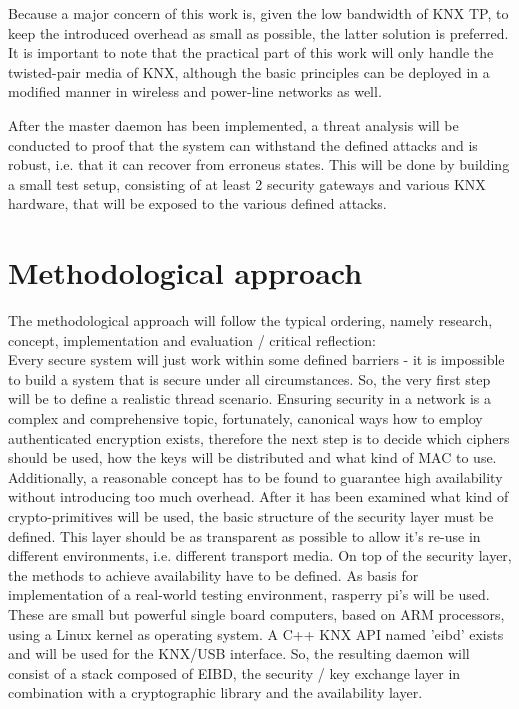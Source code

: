 \documentclass[a4paper,12pt,twoside]{memoir}
\begin{document}
Because a  major concern of this work is, given the low
bandwidth of KNX TP, to keep the introduced overhead as small as possible, the latter solution is preferred. It is important to note that the practical part of this work will only
handle the twisted-pair media of KNX, although the basic principles can be deployed in a modified manner in
wireless and power-line networks as well. 

After the master daemon has been implemented, a threat analysis will be conducted to proof that the system can withstand the defined attacks and is robust,
i.e. that it can recover from erroneus states. This will be done by building a small test setup, consisting of at least 2 security gateways and various
KNX hardware, that will be exposed to the various defined attacks.

\section{Methodological approach}

The methodological approach will follow the typical ordering, namely research, concept, implementation and 
evaluation / critical reflection:
\\

Every secure system will just work within some defined barriers - it is impossible to build a system that
is secure under all circumstances. So, the very first step will be to define a realistic
thread scenario. 
Ensuring security in a network is a complex and comprehensive topic, fortunately, canonical ways how to employ authenticated
encryption exists, therefore the next step is to decide which ciphers should be used, how the keys will
be  distributed and what kind of MAC to use. Additionally, a reasonable concept has to be found
to guarantee high availability without introducing too much overhead.
After it has been examined what kind of crypto-primitives will be used, the basic structure 
of the security layer must be defined. This layer should be as transparent as possible to
allow it's re-use in different environments, i.e. different transport media. 
On top of the security layer, the methods to achieve availability have to be defined.
As basis for implementation of a real-world testing environment, rasperry pi's will be used.
These are small but powerful single board computers, based on ARM processors, 
using a Linux kernel as operating system. A C++ KNX API named 'eibd' exists and will be used
for the KNX/USB interface. So, the resulting daemon will consist of a stack composed of EIBD,
the security / key exchange layer in combination with a cryptographic library and the availability layer.
\end{document}
